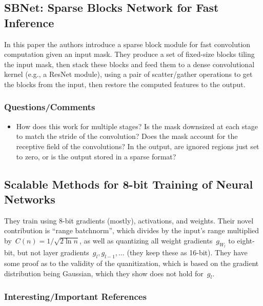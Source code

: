 \documentclass[a4paper, 12pt]{article}
\begin{document}
\subsection{SBNet: Sparse Blocks Network for Fast
            Inference~\cite{ren2018sbnet}}

In this paper the authors introduce a sparse block module for fast convolution
computation given an input mask. They produce a set of fixed-size blocks tiling
the input mask, then stack these blocks and feed them to a dense convolutional
kernel (e.g., a ResNet module), using a pair of scatter/gather operations to
get the blocks from the input, then restore the computed features to the
output.

\subsubsection{Questions/Comments}

\begin{itemize}
        \item How does this work for multiple stages? Is the mask downsized at
                each stage to match the stride of the convolution? Does the
                mask account for the receptive field of the convolutions? In
                the output, are ignored regions just set to zero, or is the
                output stored in a sparse format?
\end{itemize}


\subsection{Scalable Methods for 8-bit Training of Neural
            Networks~\cite{banner2018scalable}}

They train using 8-bit gradients (mostly), activations, and weights. Their
novel contribution is ``range batchnorm'', which divides by the input's range
multiplied by~$C(n) = 1/\sqrt{2\ln n}$, as well as quantizing all weight
gradients~$g_{W_l}$ to eight-bit, but not layer gradients~$g_l, g_{l - 1},
\dots$ (they keep these as 16-bit). They have some proof as to the validity of
the quanitization, which is based on the gradient distribution being Gaussian,
which they show does not hold for~$g_l$.

\subsubsection{Interesting/Important References}
\end{document}
